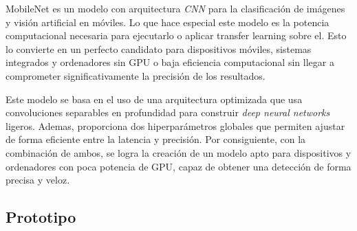 MobileNet es un modelo con arquitectura \textit{CNN} para la clasificación de imágenes y visión artificial en móviles. Lo que hace especial este modelo es la potencia computacional necesaria para ejecutarlo o aplicar transfer learning sobre el. Esto lo convierte en un perfecto candidato para dispositivos móviles, sistemas integrados y ordenadores sin GPU o baja eficiencia computacional sin llegar a comprometer significativamente la precisión de los resultados.

Este modelo se basa en el uso de una arquitectura optimizada que usa convoluciones separables en profundidad para construir \textit{deep neural networks} ligeros. Ademas, proporciona dos hiperparámetros globales que permiten ajustar de forma eficiente entre la latencia y precisión. Por consiguiente, con la combinación de ambos, se logra la creación de un modelo apto para dispositivos y ordenadores con poca potencia de GPU, capaz de obtener una detección de forma precisa y veloz.

\subsection*{Prototipo}

